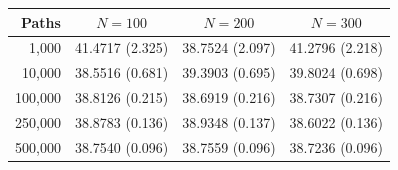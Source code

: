 \begin{tabular}{rccc}
\toprule
Paths & $N=100$ & $N=200$ & $N=300$ \\
\midrule
1,000 & 41.4717 (2.325) & 38.7524 (2.097) & 41.2796 (2.218) \\
10,000 & 38.5516 (0.681) & 39.3903 (0.695) & 39.8024 (0.698) \\
100,000 & 38.8126 (0.215) & 38.6919 (0.216) & 38.7307 (0.216) \\
250,000 & 38.8783 (0.136) & 38.9348 (0.137) & 38.6022 (0.136) \\
500,000 & 38.7540 (0.096) & 38.7559 (0.096) & 38.7236 (0.096) \\
\bottomrule
\end{tabular}
